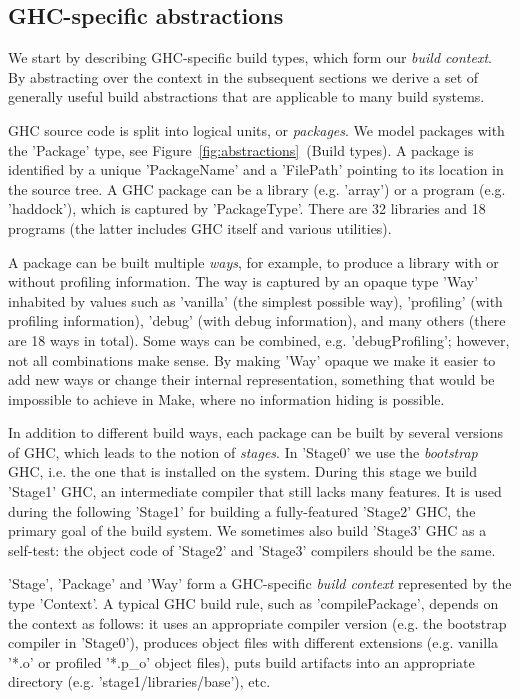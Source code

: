 \subsection{GHC-specific abstractions\label{sec:ghc-context}}

We start by describing GHC-specific build types, which form our \emph{build
context}. By abstracting over the context in the subsequent sections we derive a
set of generally useful build abstractions that are applicable to many build
systems.

GHC source code is split into logical units, or \emph{packages}. We model
packages with the \lst'Package' type, see
Figure~\ref{fig:abstractions}~(Build types). A package is identified by a
unique \lst'PackageName' and a \lst'FilePath' pointing to its location in the
source tree. A GHC package can be a library (e.g. \lst'array') or a program
(e.g. \lst'haddock'), which is captured by \lst'PackageType'. There are
32 libraries and 18 programs (the latter includes GHC itself and various utilities).

A package can be built multiple \emph{ways}, for example, to produce a library
with or without profiling information. The way is captured by an opaque
type \lst'Way' inhabited by values such as \lst'vanilla' (the simplest
possible way), \lst'profiling' (with profiling information), \lst'debug'
(with debug information), and many others (there are 18 ways in total). Some
ways can be combined, e.g. \lst'debugProfiling'; however, not all combinations
make sense. By making \lst'Way' opaque we make it easier
to add new ways or change their internal representation, something that would be
impossible to achieve in Make, where no information hiding is possible.

In addition to different build ways, each package can be built by several
versions of GHC, which leads to the notion of \emph{stages}.
In \lst'Stage0' we use the \emph{bootstrap} GHC, i.e. the one that is
installed on the system. During this stage we build \lst'Stage1' GHC, an
intermediate compiler that still lacks many features. It is used during the
following \lst'Stage1' for building a fully-featured \lst'Stage2' GHC, the
primary goal of the build system. We sometimes also build \lst'Stage3' GHC as
a self-test: the object code of \lst'Stage2' and \lst'Stage3' compilers
should be the same.

\lst'Stage', \lst'Package' and \lst'Way' form a GHC-specific
\emph{build context} represented by the type \lst'Context'. A typical GHC build
rule, such as \lst'compilePackage', depends on the context as follows: it
uses an appropriate compiler version (e.g. the bootstrap compiler in
\lst'Stage0'), produces object files with different extensions (e.g. vanilla
\lst'*.o' or profiled \lst'*.p_o' object files), puts build artifacts
into an appropriate directory (e.g. \lst'stage1/libraries/base'), etc.

